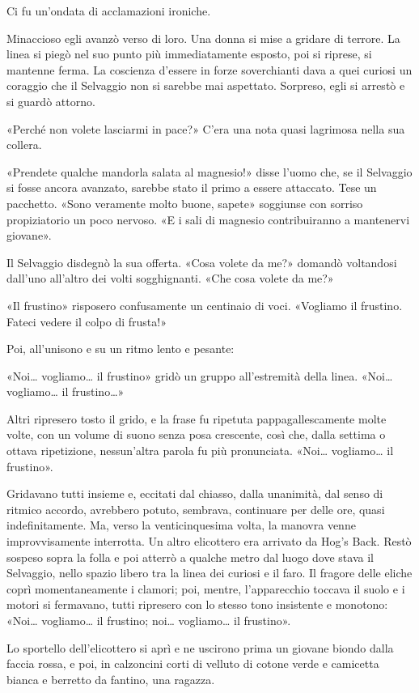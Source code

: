 \documentclass[
a5paper, %
10pt, %
twoside, 
onecolumn, %
openany, %
]{memoir}
\begin{document}
Ci fu un’ondata di acclamazioni ironiche.

Minaccioso egli avanzò verso di loro. Una donna si mise a gridare di terrore. La linea si piegò nel suo punto più immediatamente esposto, poi si riprese, si mantenne ferma. La coscienza d’essere in forze soverchianti dava a quei curiosi un coraggio che il Selvaggio non si sarebbe mai aspettato. Sorpreso, egli si arrestò e si guardò attorno.

«Perché non volete lasciarmi in pace?» C’era una nota quasi lagrimosa nella sua collera.

«Prendete qualche mandorla salata al magnesio!» disse l’uomo che, se il Selvaggio si fosse ancora avanzato, sarebbe stato il primo a essere attaccato. Tese un pacchetto. «Sono veramente molto buone, sapete» soggiunse con sorriso propiziatorio un poco nervoso. «E i sali di magnesio contribuiranno a mantenervi giovane».

Il Selvaggio disdegnò la sua offerta. «Cosa volete da me?» domandò voltandosi dall’uno all’altro dei volti sogghignanti. «Che cosa volete da me?»

«Il frustino» risposero confusamente un centinaio di voci. «Vogliamo il frustino. Fateci vedere il colpo di frusta!»

Poi, all’unisono e su un ritmo lento e pesante:

«Noi… vogliamo… il frustino» gridò un gruppo all’estremità della linea. «Noi… vogliamo… il frustino…»

Altri ripresero tosto il grido, e la frase fu ripetuta pappagallescamente molte volte, con un volume di suono senza posa crescente, così che, dalla settima o ottava ripetizione, nessun’altra parola fu più pronunciata. «Noi… vogliamo… il frustino».

Gridavano tutti insieme e, eccitati dal chiasso, dalla unanimità, dal senso di ritmico accordo, avrebbero potuto, sembrava, continuare per delle ore, quasi indefinitamente. Ma, verso la venticinquesima volta, la manovra venne improvvisamente interrotta. Un altro elicottero era arrivato da Hog’s Back. Restò sospeso sopra la folla e poi atterrò a qualche metro dal luogo dove stava il Selvaggio, nello spazio libero tra la linea dei curiosi e il faro. Il fragore delle eliche coprì momentaneamente i clamori; poi, mentre, l’apparecchio toccava il suolo e i motori si fermavano, tutti ripresero con lo stesso tono insistente e monotono: «Noi… vogliamo… il frustino; noi… vogliamo… il frustino».

Lo sportello dell’elicottero si aprì e ne uscirono prima un giovane biondo dalla faccia rossa, e poi, in calzoncini corti di velluto di cotone verde e camicetta bianca e berretto da fantino, una ragazza.
\end{document}
